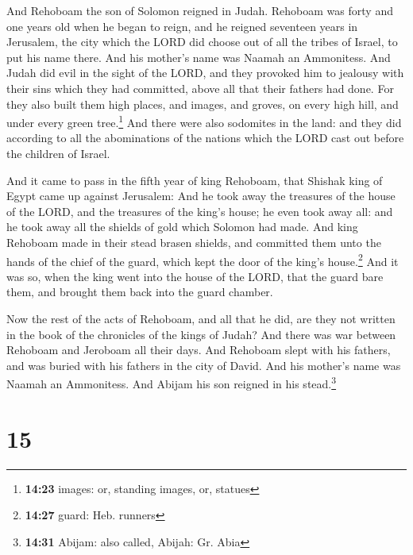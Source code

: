  And Rehoboam the son of Solomon reigned in Judah.
Rehoboam was forty and one years old when he began to reign, and he
reigned seventeen years in Jerusalem, the city which the LORD did choose
out of all the tribes of Israel, to put his name there. And his mother's
name was Naamah an Ammonitess.  And Judah did evil in the
sight of the LORD, and they provoked him to jealousy with their sins
which they had committed, above all that their fathers had done.
 For they also built them high places, and images, and
groves, on every high hill, and under every green tree.\footnote{\textbf{14:23}
  images: or, standing images, or, statues}  And there
were also sodomites in the land: and they did according to all the
abominations of the nations which the LORD cast out before the children
of Israel.

 And it came to pass in the fifth year of king Rehoboam,
that Shishak king of Egypt came up against Jerusalem: 
And he took away the treasures of the house of the LORD, and the
treasures of the king's house; he even took away all: and he took away
all the shields of gold which Solomon had made.  And king
Rehoboam made in their stead brasen shields, and committed them unto the
hands of the chief of the guard, which kept the door of the king's
house.\footnote{\textbf{14:27} guard: Heb. runners}  And
it was so, when the king went into the house of the LORD, that the guard
bare them, and brought them back into the guard chamber.

 Now the rest of the acts of Rehoboam, and all that he
did, are they not written in the book of the chronicles of the kings of
Judah?  And there was war between Rehoboam and Jeroboam
all their days.  And Rehoboam slept with his fathers, and
was buried with his fathers in the city of David. And his mother's name
was Naamah an Ammonitess. And Abijam his son reigned in his
stead.\footnote{\textbf{14:31} Abijam: also called, Abijah: Gr. Abia}

\hypertarget{section-14}{%
\section{15}\label{section-14}}

